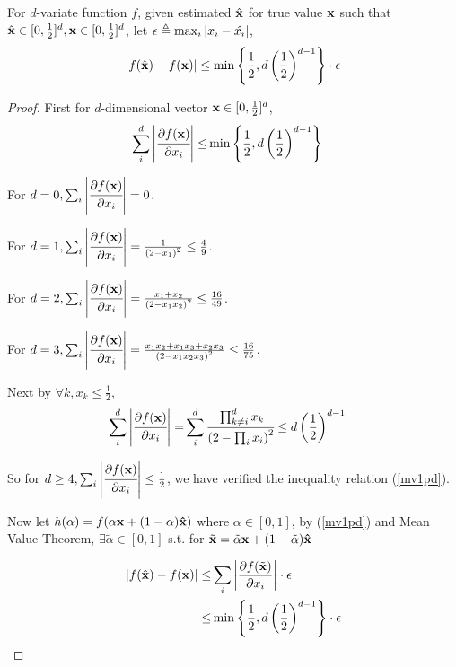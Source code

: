 	\begin{lemma}
		\label{meanvalue1}
		For $d$-variate function $f$, given estimated $\hat{\bf x}$ for true value ${\bf x}$ such that $\hat{\bf x} \in  [0, \frac{1}{2}]^d, {\bf x} \in [0, \frac{1}{2}]^d$, let $\epsilon \triangleq \max_i{\left\vert x_i - \hat{x_i}\right\vert}$,
		\begin{align*}
			\left\vert f(\hat{\bf x}) - f({\bf x})\right\vert
		\leq  \min{\left\{\frac{1}{2}, d \left( \frac{1}{2} \right)^{d-1}\right\}} \cdot \epsilon
		\end{align*}
	\end{lemma}

	\begin{proof}
        First for $d$-dimensional vector ${\bf x} \in [0, \frac{1}{2}]^d$,
        \begin{align}
			\label{mv1pd}
			\sum_i^d \left\vert\cfrac{\partial f({\bf x})}{\partial x_i}\right\vert \leq & \min{\left\{\frac{1}{2}, d \left( \frac{1}{2} \right)^{d-1}\right\}}
		\end{align}

    	For $d=0, \sum_i\left\vert \cfrac{\partial f({\bf x})}{\partial x_i}\right\vert = 0$.

    	For $d=1, \sum_i\left\vert \cfrac{\partial f({\bf x})}{\partial x_i}\right\vert = \frac{1}{\left( 2 - x_1 \right)^2} \leq \frac{4}{9} $.

    	For $d=2, \sum_i\left\vert \cfrac{\partial f({\bf x})}{\partial x_i}\right\vert = \frac{x_1 + x_2}{\left( 2 - x_1x_2 \right)^2} \leq \frac{16}{49} $.

    	For $d=3, \sum_i\left\vert \cfrac{\partial f({\bf x})}{\partial x_i}\right\vert = \frac{x_1 x_2 + x_1 x_3 + x_2 x_3}{\left( 2 - x_1x_2x_3 \right)^2} \leq \frac{16}{75} $.

	Next by $\forall k, x_k \leq \frac{1}{2}$, 
    	\begin{align*}
    		\sum_i^d \left\vert\cfrac{\partial f({\bf x})}{\partial x_i}\right\vert  =& \sum_i^d \cfrac{ \prod_{k \neq i}^d x_k  }{\left( 2 - \prod_i x_i \right)^2}
    		\leq  d \left( \frac{1}{2} \right)^{d-1}
    	\end{align*}

		So for $d \geq 4, \sum_i \left\vert\cfrac{\partial f({\bf x})}{\partial x_i}\right\vert \leq \frac{1}{2}$, we have verified the inequality relation (\ref{mv1pd}).

        Now let $h(\alpha) = f(\alpha {\bf x} + (1 - \alpha) {\bf \hat{x}})$ where $\alpha \in [0,1]$, by (\ref{mv1pd}) and Mean Value Theorem, $\exists \tilde{\alpha} \in [0,1]$ s.t. for $\tilde{\bf x} = \tilde{\alpha} {\bf x} + (1 - \tilde{\alpha}) {\bf \hat{x}}$

		\begin{align*}
			\left\vert f(\hat{\bf x}) - f({\bf x})\right\vert \leq& \sum_i\left\vert \frac{\partial f(\tilde{\bf x})}{\partial x_i}\right\vert \cdot \epsilon \\
            \leq&  \min{\left\{\frac{1}{2}, d \left( \frac{1}{2} \right)^{d-1}\right\}} \cdot \epsilon
		\end{align*}
	\end{proof}

